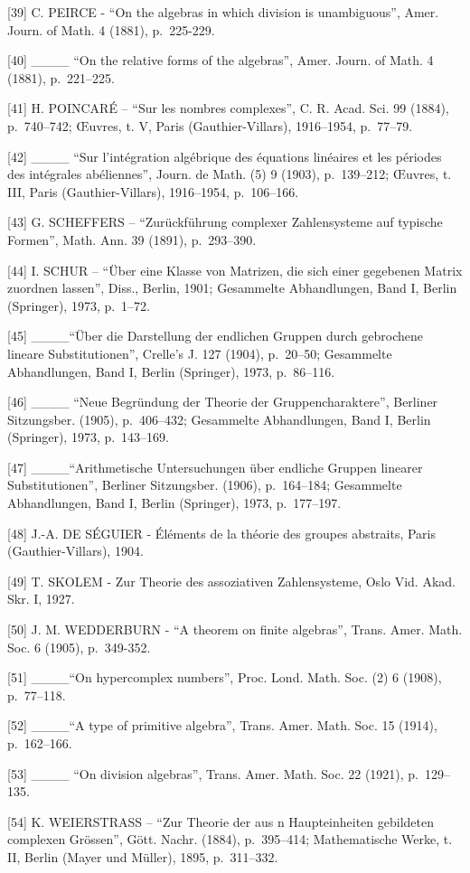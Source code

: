 {[}39{]} C. PEIRCE - ``On the algebras in which division is unambiguous'', Amer. Journ. of Math. 4 (1881), p.~225-229.

{[}40{]} \_\_\_\_ ``On the relative forms of the algebras'', Amer. Journ. of Math. 4 (1881), p.~221--225.

{[}41{]} H. POINCARÉ -- ``Sur les nombres complexes'', C. R. Acad. Sci. 99 (1884), p.~740--742; Œuvres, t. V, Paris (Gauthier-Villars), 1916--1954, p.~77--79.

{[}42{]} \_\_\_\_ ``Sur l'intégration algébrique des équations linéaires et les périodes des intégrales abéliennes'', Journ. de Math. (5) 9 (1903), p.~139--212; Œuvres, t. III, Paris (Gauthier-Villars), 1916--1954, p.~106--166.

{[}43{]} G. SCHEFFERS -- ``Zurückführung complexer Zahlensysteme auf typische Formen'', Math. Ann. 39 (1891), p.~293--390.

{[}44{]} I. SCHUR -- ``Über eine Klasse von Matrizen, die sich einer gegebenen Matrix zuordnen lassen'', Diss., Berlin, 1901; Gesammelte Abhandlungen, Band I, Berlin (Springer), 1973, p.~1--72.

{[}45{]} \_\_\_\_``Über die Darstellung der endlichen Gruppen durch gebrochene lineare Substitutionen'', Crelle's J. 127 (1904), p.~20--50; Gesammelte Abhandlungen, Band I, Berlin (Springer), 1973, p.~86--116.

{[}46{]} \_\_\_\_ ``Neue Begründung der Theorie der Gruppencharaktere'', Berliner Sitzungsber. (1905), p.~406--432; Gesammelte Abhandlungen, Band I, Berlin (Springer), 1973, p.~143--169.

{[}47{]} \_\_\_\_``Arithmetische Untersuchungen über endliche Gruppen linearer Substitutionen'', Berliner Sitzungsber. (1906), p.~164--184; Gesammelte Abhandlungen, Band I, Berlin (Springer), 1973, p.~177--197.

{[}48{]} J.-A. DE SÉGUIER - Éléments de la théorie des groupes abstraits, Paris (Gauthier-Villars), 1904.

{[}49{]} T. SKOLEM - Zur Theorie des assoziativen Zahlensysteme, Oslo Vid. Akad. Skr. I, 1927.

{[}50{]} J. M. WEDDERBURN - ``A theorem on finite algebras'', Trans. Amer. Math. Soc. 6 (1905), p.~349-352.

{[}51{]} \_\_\_\_``On hypercomplex numbers'', Proc. Lond. Math. Soc. (2) 6 (1908), p.~77--118.

{[}52{]} \_\_\_\_``A type of primitive algebra'', Trans. Amer. Math. Soc. 15 (1914), p.~162--166.

{[}53{]} \_\_\_\_ ``On division algebras'', Trans. Amer. Math. Soc. 22 (1921), p.~129--135.

{[}54{]} K. WEIERSTRASS -- ``Zur Theorie der aus n Haupteinheiten gebildeten complexen Grössen'', Gött. Nachr. (1884), p.~395--414; Mathematische Werke, t. II, Berlin (Mayer und Müller), 1895, p.~311--332.

